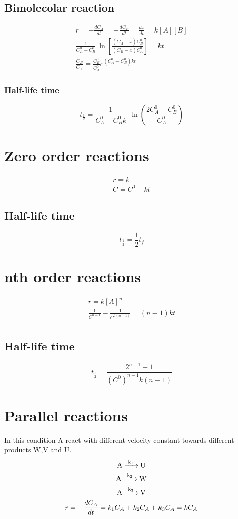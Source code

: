 \documentclass[../Master.tex]{subfiles}
\begin{document}
\begin{multicols*}{2}
		  \subsection{Bimolecolar reaction}
				   \begin{gather*}
						    r = - \frac{dC_{A}}{dt} = - \frac{dC_{B}}{dt} = \frac{dx}{dt} = k[A][B] \\
						    \frac{1}{C_{A} ^{0} - C_{B} ^{0} }~\ln\left[\frac{(C_{A} ^{0} - x)C_{B} ^{0} }{(C_{B} ^{0} - x) C_{A} ^{0} }\right] = kt\\
						    \frac{C_{B}}{C_{A}} = \frac{C_{B} ^{0} }{C_{A} ^{0} }e^{(C_{A} ^{0}-C_{B} ^{0}  )kt}
				   \end{gather*}

				   \subsubsection{Half-life time}
						    \[
								     t_{\frac{1}{2}} = \frac{1}{C_{A} ^{0} - C_{B} ^{0} k}~ ~  \ln\left(  \frac{2C_{A} ^{0} - C_{B}^{0} }{C_{A}^{0}} \right)
						    \]

		 \section{Zero order reactions}
		  \begin{gather*}
				   r = k\\
				   C = C^0 - kt
		  \end{gather*}
		  \subsection{Half-life time}
				   \[
						    t_{\frac{1}{2}}  = \frac{1}{2}t_{f}
				   \]
		 \section{nth order reactions}
		  \begin{gather*}
				   r = k[A]^{n} \\
				   \frac{1}{C^{n-1} } - \frac{1}{C^{0(n-1 )} } = (n-1)kt\\
		  \end{gather*}
		  \subsection{Half-life time}
				   \[
						    t_{\frac{1}{2}} = \frac{2^{n-1} -1 }{(C^{0} )^{n-1} k(n-1)}
				   \]

		 \section{Parallel reactions}
		  In this condition A react with different velocity constant towards different
		  products W,V and U.
		  \begin{gather*}
				   \ce{ A ->[{k_{1}}] U} \\
				   \ce{ A ->[{k_{2}}] W} \\
				   \ce{ A ->[{k_{3}}] V} \\
				   r =  - \frac{dC_{A} }{dt} = k_{1}C_{A} + k_{2}C_{A} + k_{3}C_{A} = kC_{A}
		  \end{gather*}


\end{multicols*}
\end{document}
